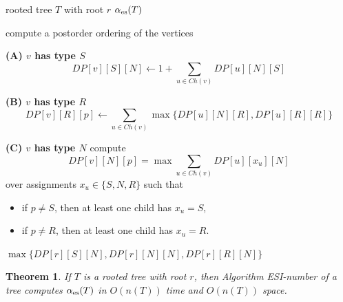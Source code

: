 \documentclass[11pt]{article}
\newtheorem{theorem}{Theorem}
\newcommand{\es}{\alpha_{\rm es}}
\newcommand{\rr}[1]{{\color{green!70!black}#1}}%
\begin{document}

\begin{algorithm}[H]
\caption{ESI-number of a tree}
\begin{algorithmic}[0]
\Require rooted tree $T$ with root $r$
\Ensure $\es(T)$

\State compute a postorder ordering of the vertices


    \Statex \textbf{(A) $v$ has type $S$}
    \State $$ DP[v][S][N] \gets
           1 + \sum_{u\in Ch(v)} DP[u][N][S]$$

    \Statex \textbf{(B) $v$ has type $R$}
        \State $$ DP[v][R][p] \gets
        \sum_{u\in Ch(v)}
        \max\{DP[u][N][R], DP[u][R][R]\}$$
    \EndFor

    \Statex \textbf{(C) $v$ has type $N$}
        \State compute
        $$
        DP[v][N][p] =
        \max \sum_{u\in Ch(v)} DP[u][x_u][N]
        $$
        \hspace{1.2cm}over assignments $x_u\in\{S,N,R\}$ such that
        \begin{itemize}[leftmargin=1.7cm]
            \item if $p\neq S$, then at least one child has $x_u=S$,
            \item if $p\neq R$, then at least one child has $x_u=R$.
        \end{itemize}
    \EndFor

\EndFor

\State \Return $\max\{DP[r][S][N], DP[r][N][N], DP[r][R][N]\}$
\end{algorithmic}
\end{algorithm}

\begin{theorem}
If $T$ is a rooted tree with root $r$, then Algorithm ESI-number of a tree computes $\es(T)$ in $O(n(T))$ time and $O(n(T))$ space.
\end{theorem}
\end{document}
